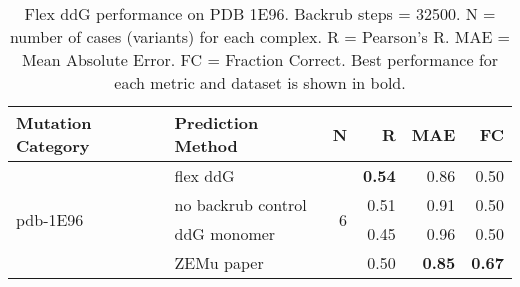 \begin{table}
  \begin{tabular}{llrrrr}
\toprule
Mutation Category &   Prediction Method &  N &    R &  MAE &   FC \\
\midrule
 \multirow{ 4}{*}{pdb-1E96} & flex ddG & \multirow{ 4}{*}{6} & \textbf{0.54} & 0.86 & 0.50  \\
 & no backrub control & & 0.51 & 0.91 & 0.50  \\
 & ddG monomer & & 0.45 & 0.96 & 0.50  \\
 & ZEMu paper & & 0.50 & \textbf{0.85} & \textbf{0.67}  \\
\bottomrule
\end{tabular}
  \caption[Flex ddG performance on PDB 1E96]{
    Flex ddG performance on PDB 1E96. Backrub steps = 32500. N = number of cases (variants) for each complex. R = Pearson's R. MAE = Mean Absolute Error. FC = Fraction Correct. Best performance for each metric and dataset is shown in bold.
  } \label{tab:table-pdb-1E96}
\end{table}
